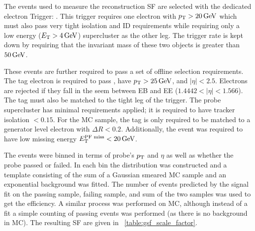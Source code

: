 The events used to measure the reconstruction SF are selected with the
dedicated electron \TnP Trigger: \TnPTrigger. This trigger requires one
electron with $p_{\mathrm{T}} > 20 \,\text{Ge\hspace{-.08em}V}$ which must also pass very tight isolation and ID
requirements while requiring only a low energy ($E_{\mathrm{T}} > 4 \,\text{Ge\hspace{-.08em}V}$) supercluster as
the other leg. The trigger rate is kept down by requiring that the invariant
mass of these two objects is greater than $50 \,\text{Ge\hspace{-.08em}V}$.

These events are further required to pass a set of offline selection
requirements. The tag electron is required to pass \EGTIGHT, have $p_{\mathrm{T}} > 25
\,\text{Ge\hspace{-.08em}V}$, and $|\eta| < 2.5$. Electrons are rejected if they fall in the seem
between EB and EE ($1.4442 < |\eta| < 1.566$). The tag must also be matched to
the tight leg of the \TnP trigger. The probe supercluster has minimal
requirements applied; it is required to have tracker isolation $< 0.15$. For
the MC sample, the tag is only required to be matched to a generator level
electron with $\Delta R < 0.2$. Additionally, the event was required to have
low \particleflow missing energy $E_{\mathrm{T}}^{\text{PF miss}} < 20 \,\text{Ge\hspace{-.08em}V}$. 

The events were binned in terms of probe's $p_{\mathrm{T}}$ and $\eta$ as well as whether
the probe passed or failed. In each bin the \mee distribution was constructed
and a template consisting of the sum of a Gaussian smeared \Ztoee MC sample and
an exponential background was fitted. The number of events predicted by the
signal fit on the passing sample, failing sample, and sum of the two samples
was used to get the efficiency. A similar process was performed on MC, although
instead of a fit a simple counting of passing events was performed (as there is
no background in MC). The resulting SF are given in
\TAB~\ref{table:gsf_scale_factor}.

